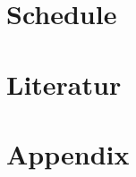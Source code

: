 \documentclass[12pt, a4paper]{article}
\begin{document}
\section{Schedule}
\section{Literatur}


\newpage

\renewcommand{\thesubsection}{\Alph{subsection}}
\setcounter{page}{\value{lastroman}}
\section*{Appendix}
\listoffigures


\end{document}
